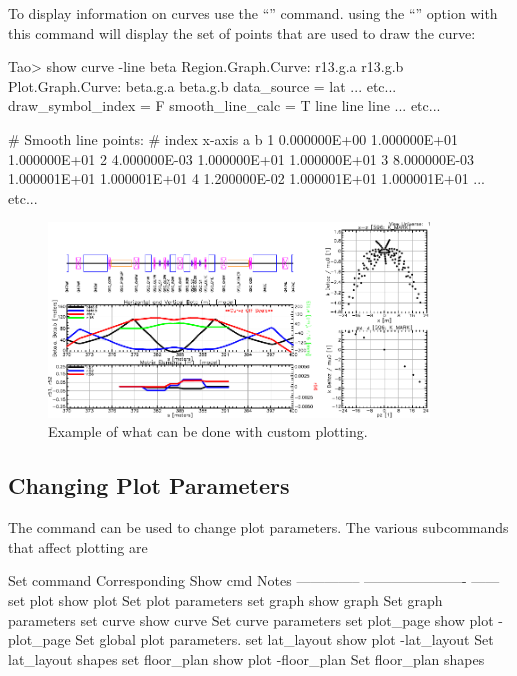\documentclass{hitec}     %
\begin{document}
To display information on curves use the ``'' command. using the ``''
option with this command will display the set of points that are used to draw the curve:
\begin{code}
Tao> show curve -line beta
Region.Graph.Curve: r13.g.a
                    r13.g.b
Plot.Graph.Curve:   beta.g.a
                    beta.g.b
data_source          = lat
... etc...
draw_symbol_index    = F
smooth_line_calc     = T
line%
line%
line%
... etc...

# Smooth line points:
# index        x-axis             a             b
      1  0.000000E+00  1.000000E+01  1.000000E+01
      2  4.000000E-03  1.000000E+01  1.000000E+01
      3  8.000000E-03  1.000001E+01  1.000001E+01
      4  1.200000E-02  1.000001E+01  1.000001E+01
... etc...
\end{code}

\begin{figure}[tb]
  \centering
  \includegraphics[width=0.90\textwidth]{fancy-plot.pdf}
  \caption{Example of what can be done with custom plotting.}
  \label{f:fancy}
\end{figure}

\subsection{Changing Plot Parameters}
\label{s:plot.set}

The  command can be used to change plot parameters. The various subcommands that affect
plotting are
\begin{code}
Set command       Corresponding Show cmd   Notes
--------------    ----------------------   ------
set plot          show plot                Set plot parameters
set graph         show graph               Set graph parameters
set curve         show curve               Set curve parameters
set plot_page     show plot -plot_page     Set global plot parameters.
set lat_layout    show plot -lat_layout    Set lat_layout shapes
set floor_plan    show plot -floor_plan    Set floor_plan shapes
\end{code}
\end{document}
